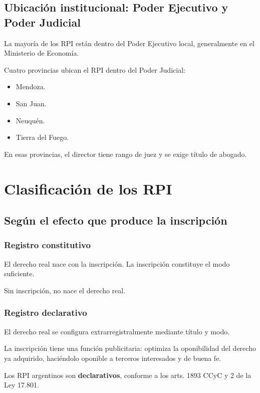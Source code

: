 \documentclass[12pt]{book}
\begin{document}
\section{Ubicaci\'on institucional: Poder Ejecutivo y Poder Judicial}

La mayor\'ia de los RPI est\'an dentro del Poder Ejecutivo local, generalmente en el Ministerio de Econom\'ia.

Cuatro provincias ubican el RPI dentro del Poder Judicial:

\begin{itemize}
    \item Mendoza.
    \item San Juan.
    \item Neuqu\'en.
    \item Tierra del Fuego.
\end{itemize}

En esas provincias, el director tiene rango de juez y se exige t\'itulo de abogado.

\chapter{Clasificaci\'on de los RPI}

\section{Seg\'un el efecto que produce la inscripci\'on}

\subsection{Registro constitutivo}

El derecho real nace con la inscripci\'on. La inscripci\'on constituye el modo suficiente.

Sin inscripci\'on, no nace el derecho real.

\subsection{Registro declarativo}

El derecho real se configura extrarregistralmente mediante t\'itulo y modo.

La inscripci\'on tiene una funci\'on publicitaria: optimiza la oponibilidad del derecho ya adquirido, haci\'endolo oponible a terceros interesados y de buena fe.

Los RPI argentinos son \textbf{declarativos}, conforme a los arts. 1893 CCyC y 2 de la Ley 17.801.
\end{document}
